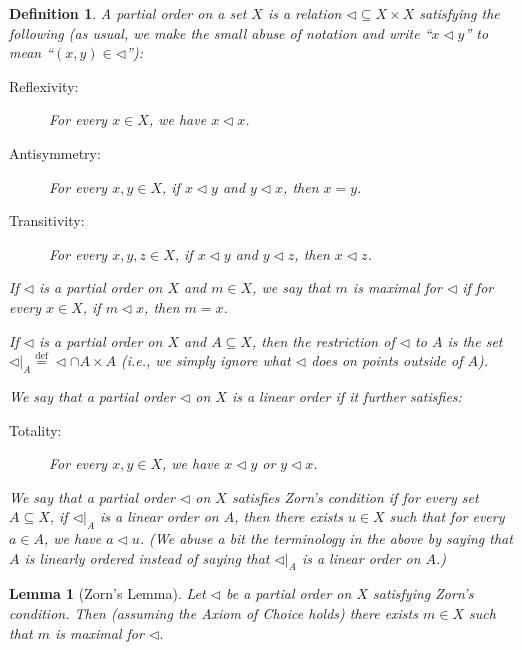 \documentclass[12pt]{article}
\theoremstyle{bigskipthmstyle}
\theoremstyle{thmstyle}
\newtheorem{lemma}[theorem]{Lemma}
\theoremstyle{plainstyle}
\newtheorem{definition}[theorem]{Definition}
\newcommand{\df}{\stackrel{\text{def}}{=}}
\newcommand{\rest}{\mathord{\vert}}
\begin{document}
\begin{definition}
  A \emph{partial order} on a set $X$ is a relation ${\lhd}\subseteq X\times X$ satisfying the
  following (as usual, we make the small abuse of notation and write ``$x\lhd y$'' to mean
  ``$(x,y)\in{\lhd}$''):
  \begin{description}
  \item[Reflexivity:] For every $x\in X$, we have $x\lhd x$.
  \item[Antisymmetry:] For every $x,y\in X$, if $x\lhd y$ and $y\lhd x$, then $x = y$.
  \item[Transitivity:] For every $x,y,z\in X$, if $x\lhd y$ and $y\lhd z$, then $x\lhd z$.
  \end{description}

  If $\lhd$ is a partial order on $X$ and $m\in X$, we say that $m$ is \emph{maximal} for $\lhd$ if
  for every $x\in X$, if $m\lhd x$, then $m=x$.

  If $\lhd$ is a partial order on $X$ and $A\subseteq X$, then the restriction of $\lhd$ to $A$ is
  the set ${\lhd\rest_A}\df{\lhd}\cap A\times A$ (i.e., we simply ignore what $\lhd$ does on
  points outside of $A$).

  We say that a partial order $\lhd$ on $X$ is a \emph{linear order} if it further satisfies:
  \begin{description}
  \item[Totality:] For every $x,y\in X$, we have $x\lhd y$ or $y\lhd x$.
  \end{description}

  We say that a partial order $\lhd$ on $X$ satisfies \emph{Zorn's condition} if for every set
  $A\subseteq X$, if $\lhd\rest_A$ is a linear order on $A$, then there exists $u\in X$ such that
  for every $a\in A$, we have $a\lhd u$. (We abuse a bit the terminology in the above by saying that
  $A$ is linearly ordered instead of saying that $\lhd\rest_A$ is a linear order on $A$.)
\end{definition}

\begin{lemma}[Zorn's Lemma]\label{lem:Zorn}
  Let $\lhd$ be a partial order on $X$ satisfying Zorn's condition. Then (assuming the Axiom of
  Choice holds) there exists $m\in X$ such that $m$ is maximal for $\lhd$.  
\end{lemma}
\end{document}
